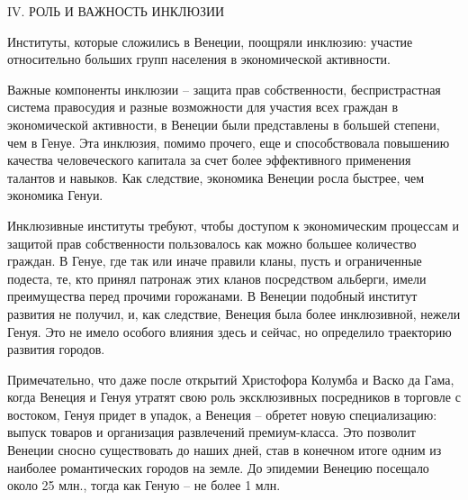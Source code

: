IV. РОЛЬ И ВАЖНОСТЬ ИНКЛЮЗИИ

Институты, которые сложились в Венеции, поощряли инклюзию: участие относительно
больших групп населения в экономической активности.

Важные компоненты инклюзии – защита прав собственности, беспристрастная система
правосудия и разные возможности для участия всех граждан в экономической
активности, в Венеции были представлены в большей степени, чем в Генуе. Эта
инклюзия, помимо прочего, еще и  способствовала повышению качества
человеческого капитала за счет более эффективного применения талантов и
навыков. Как следствие, экономика Венеции росла быстрее, чем экономика Генуи.

Инклюзивные институты требуют, чтобы доступом к экономическим процессам и
защитой прав собственности пользовалось как можно большее количество граждан. В
Генуе, где так или иначе правили кланы, пусть и ограниченные подеста, те, кто
принял патронаж этих кланов посредством альберги, имели преимущества перед
прочими горожанами. В Венеции подобный институт развития не получил, и, как
следствие, Венеция была более инклюзивной, нежели Генуя. Это не имело особого
влияния здесь и сейчас, но определило траекторию развития городов.

Примечательно, что даже после открытий Христофора Колумба и Васко да Гама,
когда Венеция и Генуя утратят свою роль эксклюзивных посредников в торговле с
востоком, Генуя придет в упадок, а Венеция – обретет новую специализацию:
выпуск товаров и организация развлечений премиум-класса. Это позволит Венеции
сносно существовать до наших дней, став в конечном итоге одним из наиболее
романтических городов на земле. До эпидемии Венецию посещало около 25 млн.,
тогда как Геную – не более 1 млн.

